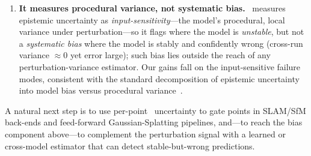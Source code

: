 \begin{enumerate}[label=(\roman*),leftmargin=1.8em,itemsep=2pt,topsep=2pt]
where it is already well-calibrated, so the gain is conditional---which we view as evidence the signal
is real rather than a universal claim.
\item \textbf{It measures procedural variance, not systematic bias.} \trustr\ measures epistemic
uncertainty as \emph{input-sensitivity}---the model's procedural, local variance under
perturbation---so it flags where the model is \emph{unstable}, but not a \emph{systematic bias} where
the model is stably and confidently wrong (cross-run variance $\approx 0$ yet error large); such bias
lies outside the reach of any perturbation-variance estimator. Our gains fall on the input-sensitive
failure modes, consistent with the standard decomposition of epistemic uncertainty into model bias
versus procedural variance~\cite{epistemic_incomplete}.
\end{enumerate}

A natural next step is to use per-point \trustr\ uncertainty to gate points in SLAM/SfM back-ends and
feed-forward Gaussian-Splatting pipelines, and---to reach the bias component above---to complement the
perturbation signal with a learned or cross-model estimator that can detect stable-but-wrong
predictions.
